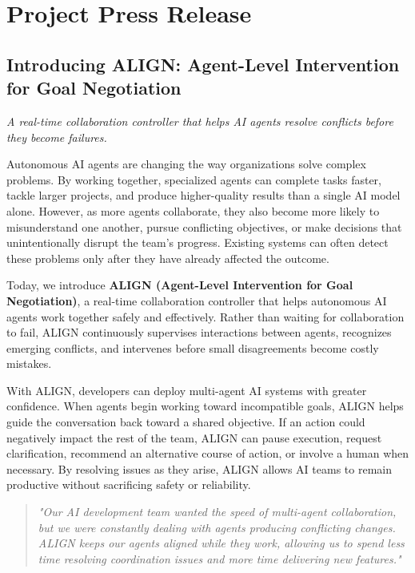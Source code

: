 \documentclass[11pt]{article}
\begin{document}
\newpage
{
\setlength{\parindent}{0pt}
\setlength{\parskip}{0.5\baselineskip}

\section{Project Press Release}

\subsection{Introducing ALIGN: Agent-Level Intervention for Goal Negotiation}

\textit{A real-time collaboration controller that helps AI agents resolve conflicts before they become failures.}

\vspace{0.5em}

Autonomous AI agents are changing the way organizations solve complex problems. By working together, specialized agents can complete tasks faster, tackle larger projects, and produce higher-quality results than a single AI model alone. However, as more agents collaborate, they also become more likely to misunderstand one another, pursue conflicting objectives, or make decisions that unintentionally disrupt the team's progress. Existing systems can often detect these problems only after they have already affected the outcome.

Today, we introduce \textbf{ALIGN (Agent-Level Intervention for Goal Negotiation)}, a real-time collaboration controller that helps autonomous AI agents work together safely and effectively. Rather than waiting for collaboration to fail, ALIGN continuously supervises interactions between agents, recognizes emerging conflicts, and intervenes before small disagreements become costly mistakes.

With ALIGN, developers can deploy multi-agent AI systems with greater confidence. When agents begin working toward incompatible goals, ALIGN helps guide the conversation back toward a shared objective. If an action could negatively impact the rest of the team, ALIGN can pause execution, request clarification, recommend an alternative course of action, or involve a human when necessary. By resolving issues as they arise, ALIGN allows AI teams to remain productive without sacrificing safety or reliability.

\begin{quote}
\emph{"Our AI development team wanted the speed of multi-agent collaboration, but we were constantly dealing with agents producing conflicting changes. ALIGN keeps our agents aligned while they work, allowing us to spend less time resolving coordination issues and more time delivering new features."}


\end{quote}}
\end{document}
